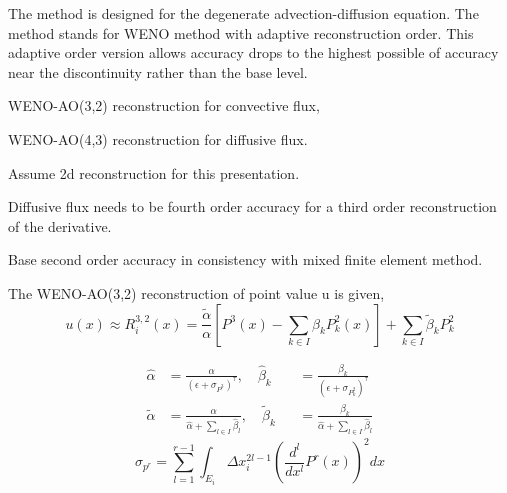 \documentclass[usenames,dvipsnames,letterpaper,landscape,final]{slides}
\begin{document}
\begin{myslideNoFooter}
The  method is designed for the degenerate advection-diffusion equation. The  method stands for WENO method with adaptive reconstruction order.
This adaptive order version allows accuracy drops to the highest possible of accuracy near the 
discontinuity rather than the base level.

\bigskip
{}
\begin{blist}
	\item	  WENO-AO(3,2) reconstruction for convective flux,
	\item	  WENO-AO(4,3) reconstruction for diffusive flux.
\end{blist}

\begin{blist}
	\item Assume 2d reconstruction for this presentation.
	\item Diffusive flux needs to be fourth order accuracy for a third order reconstruction of the derivative.
	\item Base second order accuracy in consistency with mixed finite element method.
	\end{blist}
\end{myslideNoFooter}

\begin{myslideNoFooter}

\parbox{0.7\textwidth}{\raggedright
The WENO-AO(3,2) reconstruction of point value u is given,
\begin{equation*}
u(x) \approx R_i^{3,2}(x) = \frac{\tilde \alpha}{\alpha}[P^3(x) - \sum_{k\in I}\beta_k P_k^2(x)] + \sum_{k\in I}\tilde \beta_k P_k^2
\end{equation*}
}\parbox{0.3\textwidth}{\setlength\unitlength{4.5pt}

}

\begin{equation*}
    \begin{aligned}
    \hat{\alpha} &= \frac{\alpha}{(\epsilon+ \sigma_{P^3})^\tau}, \quad \hat{\beta}_k &&= \frac{\beta_k}{(\epsilon+ \sigma_{P_k^2})^\tau}\\
     \tilde{\alpha} &= \frac{\alpha}{\hat{\alpha} + \sum_{l\in I}\hat{\beta}_l}, \quad \tilde{\beta}_k &&= \frac{\beta_k}{\hat{\alpha} + \sum_{l\in I}\hat{\beta}_l}
    \end{aligned}
\end{equation*}
\begin{equation*}
\sigma_{p^r} = \sum_{l=1}^{r-1}\int_{E_i} \Delta x_i^{2l-1}(\frac{d^l}{dx^l}P^r(x))^2 dx
\end{equation*}

\end{myslideNoFooter}
\end{document}
